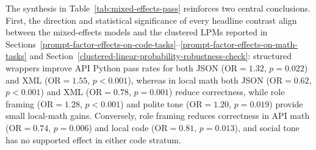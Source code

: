 \documentclass[a4paper,fleqn]{cas-sc}
\begin{document}
The synthesis in Table~\ref{tab:mixed-effects-pass} reinforces two central conclusions. First, the direction and statistical significance of every headline contrast align between the mixed-effects models and the clustered LPMs reported in Sections~\ref{prompt-factor-effects-on-code-tasks}--\ref{prompt-factor-effects-on-math-tasks} and Section~\ref{clustered-linear-probability-robustness-check}: structured wrappers improve API Python pass rates for both JSON ($\text{OR} = 1.32$, $p = 0.022$) and XML ($\text{OR} = 1.55$, $p < 0.001$), whereas in local math both JSON ($\text{OR} = 0.62$, $p < 0.001$) and XML ($\text{OR} = 0.78$, $p = 0.001$) reduce correctness, while role framing ($\text{OR} = 1.28$, $p < 0.001$) and polite tone ($\text{OR} = 1.20$, $p = 0.019$) provide small local-math gains. Conversely, role framing reduces correctness in API math ($\text{OR} = 0.74$, $p = 0.006$) and local code ($\text{OR} = 0.81$, $p = 0.013$), and social tone has no supported effect in either code stratum.
\end{document}
